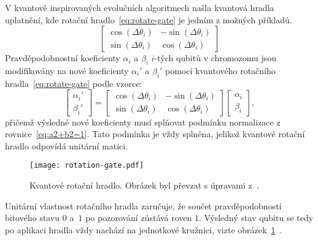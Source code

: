 V kvantově inspirovaných evolučních algoritmech našla kvantová hradla uplatnění, kde rotační hradlo~\ref{eq:rotate-gate} je jedním z možných příkladů.
\begin{equation}\label{eq:rotate-gate}
    \begin{bmatrix}
        \cos{\left( \Delta\theta_i \right)} & - \sin{\left( \Delta\theta_i \right)} \\
        \sin{\left( \Delta\theta_i \right)} &   \cos{\left( \Delta\theta_i \right)}
    \end{bmatrix}
\end{equation}
Pravděpodobnostní koeficienty $\alpha_i$ a $\beta_i$ $i$-tých qubitů v chromozomu jsou modifikovány na nové koeficienty $\alpha_i'$ a $\beta_i'$ pomocí kvantového rotačního hradla~\ref{eq:rotate-gate} podle vzorce: 
\begin{equation}\label{eq:rotation-gate-angles}
    \begin{bmatrix}
        \alpha_i' \\
        \beta_i' 
    \end{bmatrix}
    =
    \begin{bmatrix}
        \cos{\left( \Delta\theta_i \right)} & - \sin{\left( \Delta\theta_i \right)} \\
        \sin{\left( \Delta\theta_i \right)} &   \cos{\left( \Delta\theta_i \right)}
    \end{bmatrix}
    \begin{bmatrix}
        \alpha_i \\
        \beta_i 
    \end{bmatrix},
\end{equation}
přičemž výsledné nové koeficienty musí splňovat podmínku normalizace z rovnice~\ref{eq:a2+b2=1}. 
Tato podmínka je vždy splněna, jelikož kvantové rotační hradlo odpovídá unitární matici. 
\begin{figure}[ht!]
    \centering
    \texttt{[image: rotation-gate.pdf]}
    \caption{Kvantové rotační hradlo. Obrázek byl převzat s úpravami z~\cite{NaturalComputing}.}
    \label{fig:rotation-gate}
\end{figure}
Unitární vlastnost rotačního hradla zaručuje, že součet pravděpodobností bitového stavu $0$ a~$1$ po pozorování zůstává roven $1$. 
Výsledný stav qubitu se tedy po aplikaci hradla vždy nachází na jednotkové kružnici, vizte obrázek~\ref{fig:rotation-gate}~\cite{NaturalComputing}.


